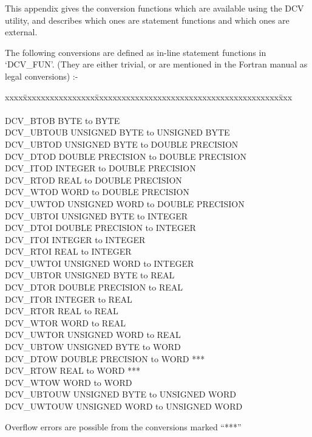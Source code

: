 This appendix gives the conversion functions which are available using
the DCV utility, and describes which ones are statement functions and
which ones are external. 

The following conversions are defined as in-line statement functions in 
`DCV\_FUN'. (They are either trivial, or are mentioned in the Fortran
manual as legal conversions) :-

\begin{tabbing}
xxxx\=xxxxxxxxxxxxxxxx\=xxxxxxxxxxxxxxxxxxxxxxxxxxxxxxxxxxxxxxxxx\=xxx\kill 
{}   \\
\\
\>DCV\_BTOB   \>BYTE to BYTE \\
\>DCV\_UBTOUB \>UNSIGNED BYTE to UNSIGNED BYTE \\
\>DCV\_UBTOD  \>UNSIGNED BYTE to DOUBLE PRECISION \\
\>DCV\_DTOD   \>DOUBLE PRECISION to DOUBLE PRECISION \\
\>DCV\_ITOD   \>INTEGER to DOUBLE PRECISION \\
\>DCV\_RTOD   \>REAL to DOUBLE PRECISION \\
\>DCV\_WTOD   \>WORD to DOUBLE PRECISION \\
\>DCV\_UWTOD  \>UNSIGNED WORD to DOUBLE PRECISION \\
\>DCV\_UBTOI  \>UNSIGNED BYTE to INTEGER \\
\>DCV\_DTOI   \>DOUBLE PRECISION to INTEGER \\
\>DCV\_ITOI   \>INTEGER to INTEGER \\
\>DCV\_RTOI   \>REAL to INTEGER \\
\>DCV\_UWTOI  \>UNSIGNED WORD to INTEGER \\
\>DCV\_UBTOR  \>UNSIGNED BYTE to REAL \\
\>DCV\_DTOR   \>DOUBLE PRECISION to REAL \\
\>DCV\_ITOR   \>INTEGER to REAL \\
\>DCV\_RTOR   \>REAL to REAL \\
\>DCV\_WTOR   \>WORD to REAL \\
\>DCV\_UWTOR  \>UNSIGNED WORD to REAL \\
\>DCV\_UBTOW  \>UNSIGNED BYTE to WORD \\
\>DCV\_DTOW   \>DOUBLE PRECISION to WORD       \>*** \\
\>DCV\_RTOW   \>REAL to WORD                   \>*** \\
\>DCV\_WTOW   \>WORD to WORD \\
\>DCV\_UBTOUW \>UNSIGNED BYTE to UNSIGNED WORD \\
\>DCV\_UWTOUW \>UNSIGNED WORD to UNSIGNED WORD \\
\end{tabbing} 
Overflow errors are possible from the conversions marked ``***''

